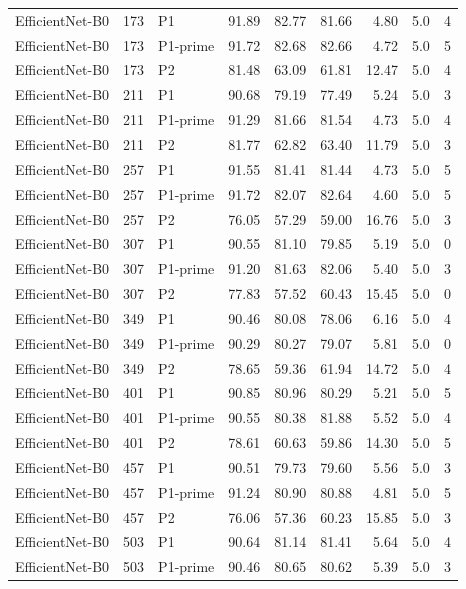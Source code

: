 {\begin{longtable}{lrlrrrrrr}
EfficientNet-B0 & 173 & P1 & 91.89 & 82.77 & 81.66 & 4.80 & 5.0 & 4 \\
EfficientNet-B0 & 173 & P1-prime & 91.72 & 82.68 & 82.66 & 4.72 & 5.0 & 5 \\
EfficientNet-B0 & 173 & P2 & 81.48 & 63.09 & 61.81 & 12.47 & 5.0 & 4 \\
EfficientNet-B0 & 211 & P1 & 90.68 & 79.19 & 77.49 & 5.24 & 5.0 & 3 \\
EfficientNet-B0 & 211 & P1-prime & 91.29 & 81.66 & 81.54 & 4.73 & 5.0 & 4 \\
EfficientNet-B0 & 211 & P2 & 81.77 & 62.82 & 63.40 & 11.79 & 5.0 & 3 \\
EfficientNet-B0 & 257 & P1 & 91.55 & 81.41 & 81.44 & 4.73 & 5.0 & 5 \\
EfficientNet-B0 & 257 & P1-prime & 91.72 & 82.07 & 82.64 & 4.60 & 5.0 & 5 \\
EfficientNet-B0 & 257 & P2 & 76.05 & 57.29 & 59.00 & 16.76 & 5.0 & 3 \\
EfficientNet-B0 & 307 & P1 & 90.55 & 81.10 & 79.85 & 5.19 & 5.0 & 0 \\
EfficientNet-B0 & 307 & P1-prime & 91.20 & 81.63 & 82.06 & 5.40 & 5.0 & 3 \\
EfficientNet-B0 & 307 & P2 & 77.83 & 57.52 & 60.43 & 15.45 & 5.0 & 0 \\
EfficientNet-B0 & 349 & P1 & 90.46 & 80.08 & 78.06 & 6.16 & 5.0 & 4 \\
EfficientNet-B0 & 349 & P1-prime & 90.29 & 80.27 & 79.07 & 5.81 & 5.0 & 0 \\
EfficientNet-B0 & 349 & P2 & 78.65 & 59.36 & 61.94 & 14.72 & 5.0 & 4 \\
EfficientNet-B0 & 401 & P1 & 90.85 & 80.96 & 80.29 & 5.21 & 5.0 & 5 \\
EfficientNet-B0 & 401 & P1-prime & 90.55 & 80.38 & 81.88 & 5.52 & 5.0 & 4 \\
EfficientNet-B0 & 401 & P2 & 78.61 & 60.63 & 59.86 & 14.30 & 5.0 & 5 \\
EfficientNet-B0 & 457 & P1 & 90.51 & 79.73 & 79.60 & 5.56 & 5.0 & 3 \\
EfficientNet-B0 & 457 & P1-prime & 91.24 & 80.90 & 80.88 & 4.81 & 5.0 & 5 \\
EfficientNet-B0 & 457 & P2 & 76.06 & 57.36 & 60.23 & 15.85 & 5.0 & 3 \\
EfficientNet-B0 & 503 & P1 & 90.64 & 81.14 & 81.41 & 5.64 & 5.0 & 4 \\
EfficientNet-B0 & 503 & P1-prime & 90.46 & 80.65 & 80.62 & 5.39 & 5.0 & 3 \\

\end{longtable}}
